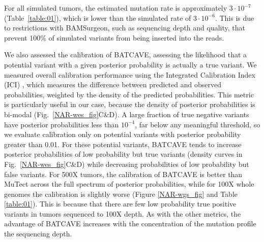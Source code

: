 \documentclass[a4,center,fleqn]{NAR}
\newcommand{\batcave}{BATCAVE\xspace}
\begin{document}
For all simulated tumors, the estimated mutation rate is approximately $3\cdot10^{-7}$ (Table~\ref{table:01}), which is lower than the simulated rate of $3\cdot10^{-6}$.
This is due to restrictions with BAMSurgeon, such as sequencing depth and quality, that prevent 100\% of simulated variants from being inserted into the reads.

We also assessed the calibration of \batcave, assessing the likelihood that a potential variant with a given posterior probability is actually a true variant.
We measured overall calibration performance using the Integrated Calibration Index (ICI) \cite{Austin2019}, which measures the difference between predicted and observed probabilities, weighted by the density of the predicted probabilities.
This metric is particularly useful in our case, because the density of posterior probabilities is bi-modal (Fig.~\ref{NAR-wes_fig}C\&D).
A large fraction of true negative variants have posterior probabilities less than $10^{-4}$, far below any meaningful threshold, so we evaluate calibration only on potential variants with posterior probability greater than 0.01.
For these potential variants, \batcave tends to increase posterior probabilities of low probability but true variants (density curves in Fig.~\ref{NAR-wes_fig}C\&D) while decreasing probabilities of low probability but false variants.
For 500X tumors, the calibration of \batcave is better than MuTect across the full spectrum of posterior probabilities, while for 100X whole genomes the calibration is slightly worse (Figure \ref{NAR-wgs_fig} and Table \ref{table:01}).
This is because that there are few low probability true positive variants in tumors sequenced to 100X depth.
As with the other metrics, the advantage of \batcave increases with the concentration of the mutation profile the sequencing depth.
\end{document}

